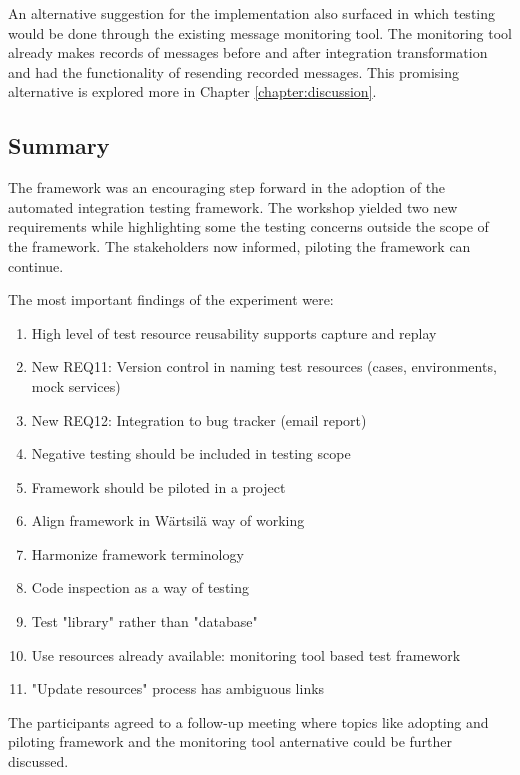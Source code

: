 \documentclass[12pt,a4paper,oneside,pdftex]{report}
\begin{document}
{An alternative suggestion for the implementation also surfaced in which testing would be done through the existing message monitoring tool. The monitoring tool already makes records of messages before and after integration transformation and had the functionality of resending recorded messages. This promising alternative is explored more in Chapter \ref{chapter:discussion}.

\subsection{Summary}

The framework was an encouraging step forward in the adoption of the automated integration testing framework. The workshop yielded two new requirements while highlighting some the testing concerns outside the scope of the framework. The stakeholders now informed, piloting the framework can continue.

The most important findings of the experiment were:
\begin{enumerate}

\item High level of test resource reusability supports capture and replay
\item New REQ11: Version control in naming test resources (cases, environments, mock services)
\item New REQ12: Integration to bug tracker (email report)
\item Negative testing should be included in testing scope
\item Framework should be piloted in a project
\item Align framework in Wärtsilä way of working
\item Harmonize framework terminology
\item Code inspection as a way of testing
\item Test "library" rather than "database"
\item Use resources already available: monitoring tool based test framework
\item "Update resources" process has ambiguous links
\end{enumerate}

The participants agreed to a follow-up meeting where topics like adopting and piloting framework and the monitoring tool anternative could be further discussed.

}
\end{document}
